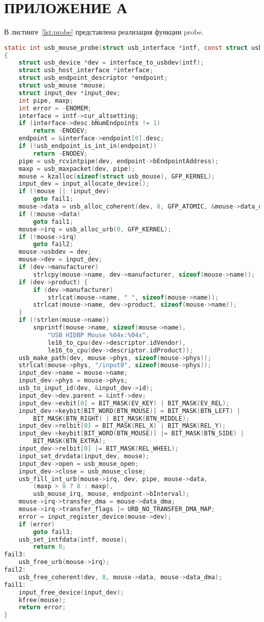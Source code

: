 \chapter*{ПРИЛОЖЕНИЕ А}


В листинге~\ref{lst:probe} представлена реализация функции probe.


\begin{lstlisting}[language=C, label=lst:probe, caption=Реализация функции probe]
static int usb_mouse_probe(struct usb_interface *intf, const struct usb_device_id *id)
{
	struct usb_device *dev = interface_to_usbdev(intf);
	struct usb_host_interface *interface;
	struct usb_endpoint_descriptor *endpoint;
	struct usb_mouse *mouse;
	struct input_dev *input_dev;
	int pipe, maxp;
	int error = -ENOMEM;
	interface = intf->cur_altsetting;
	if (interface->desc.bNumEndpoints != 1)
		return -ENODEV;
	endpoint = &interface->endpoint[0].desc;
	if (!usb_endpoint_is_int_in(endpoint))
		return -ENODEV;
	pipe = usb_rcvintpipe(dev, endpoint->bEndpointAddress);
	maxp = usb_maxpacket(dev, pipe);
	mouse = kzalloc(sizeof(struct usb_mouse), GFP_KERNEL);
	input_dev = input_allocate_device();
	if (!mouse || !input_dev)
		goto fail1;
	mouse->data = usb_alloc_coherent(dev, 8, GFP_ATOMIC, &mouse->data_dma);
	if (!mouse->data)
		goto fail1;
	mouse->irq = usb_alloc_urb(0, GFP_KERNEL);
	if (!mouse->irq)
		goto fail2;
	mouse->usbdev = dev;
	mouse->dev = input_dev;
	if (dev->manufacturer)
		strlcpy(mouse->name, dev->manufacturer, sizeof(mouse->name));
	if (dev->product) {
		if (dev->manufacturer)
			strlcat(mouse->name, " ", sizeof(mouse->name));
		strlcat(mouse->name, dev->product, sizeof(mouse->name));
	}
	if (!strlen(mouse->name))
		snprintf(mouse->name, sizeof(mouse->name),
			"USB HIDBP Mouse %04x:%04x",
			le16_to_cpu(dev->descriptor.idVendor),
			le16_to_cpu(dev->descriptor.idProduct));
	usb_make_path(dev, mouse->phys, sizeof(mouse->phys));
	strlcat(mouse->phys, "/input0", sizeof(mouse->phys));
	input_dev->name = mouse->name;
	input_dev->phys = mouse->phys;
	usb_to_input_id(dev, &input_dev->id);
	input_dev->dev.parent = &intf->dev;
	input_dev->evbit[0] = BIT_MASK(EV_KEY) | BIT_MASK(EV_REL);
	input_dev->keybit[BIT_WORD(BTN_MOUSE)] = BIT_MASK(BTN_LEFT) |
		BIT_MASK(BTN_RIGHT) | BIT_MASK(BTN_MIDDLE);
	input_dev->relbit[0] = BIT_MASK(REL_X) | BIT_MASK(REL_Y);
	input_dev->keybit[BIT_WORD(BTN_MOUSE)] |= BIT_MASK(BTN_SIDE) |
		BIT_MASK(BTN_EXTRA);
	input_dev->relbit[0] |= BIT_MASK(REL_WHEEL);
	input_set_drvdata(input_dev, mouse);
	input_dev->open = usb_mouse_open;
	input_dev->close = usb_mouse_close;
	usb_fill_int_urb(mouse->irq, dev, pipe, mouse->data,
		(maxp > 8 ? 8 : maxp),
		usb_mouse_irq, mouse, endpoint->bInterval);
	mouse->irq->transfer_dma = mouse->data_dma;
	mouse->irq->transfer_flags |= URB_NO_TRANSFER_DMA_MAP;
	error = input_register_device(mouse->dev);
	if (error)
		goto fail3;
	usb_set_intfdata(intf, mouse);
		return 0;
fail3:
	usb_free_urb(mouse->irq);
fail2:
	usb_free_coherent(dev, 8, mouse->data, mouse->data_dma);
fail1:
	input_free_device(input_dev);
	kfree(mouse);
	return error;
}
	
\end{lstlisting}
